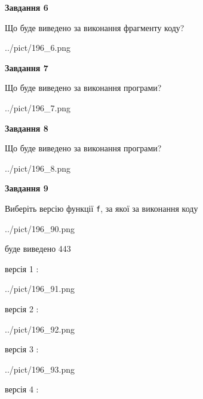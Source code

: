 \documentclass[12pt, ukrainian]{article}
\def\code#1{\Verb!#1!}
\begin{document}
{\begin {large}
{\begin {center}\textbf{Завдання 6}\end {center}}

Що буде виведено за виконання фрагменту коду?\par
\begin{center}
	{../pict/196_6.png}
\end{center}
\newpage

{\begin {center}\textbf{Завдання 7}\end {center}}

Що буде виведено за виконання програми?\par
\begin{center}
	{../pict/196_7.png}
\end{center}
\newpage

{\begin {center}\textbf{Завдання 8}\end {center}}

Що буде виведено за виконання програми?\par
\begin{center}
	{../pict/196_8.png}
\end{center}
\newpage

{\begin {center}\textbf{Завдання 9}\end {center}}

Виберіть версію функції \code{f}, за якої за виконання коду
\begin{center}
	{../pict/196_90.png}
\end{center}
буде виведено 443

\vspace{5mm}
версія 1 :

\begin{center}
	{../pict/196_91.png}
\end{center}
версія 2 :

\begin{center}
	{../pict/196_92.png}
\end{center}
версія 3 :

\begin{center}
	{../pict/196_93.png}
\end{center}
версія 4 :


\end{large}}
\end{document}
